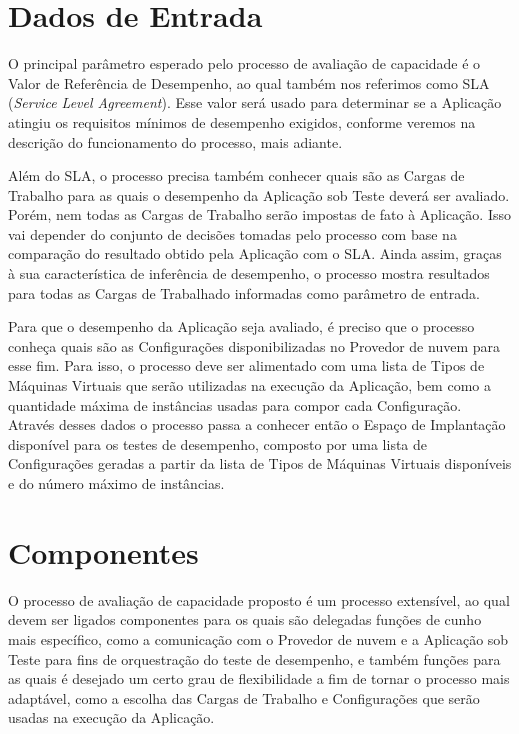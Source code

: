 \section{Dados de Entrada}

O principal parâmetro esperado pelo processo de avaliação de capacidade é o Valor
de Referência de Desempenho, ao qual também nos referimos como SLA 
(\emph{Service Level Agreement}). Esse valor será usado para determinar 
se a Aplicação atingiu os requisitos mínimos de desempenho exigidos, conforme
veremos na descrição do funcionamento do processo, mais adiante.

Além do SLA, o processo precisa também conhecer quais são as Cargas de Trabalho
para as quais o desempenho da Aplicação sob Teste deverá ser avaliado. Porém,
nem todas as Cargas de Trabalho serão impostas de fato à Aplicação. Isso vai 
depender do conjunto de decisões tomadas pelo processo com base na comparação do 
resultado obtido pela Aplicação com o SLA. Ainda assim, graças à sua característica 
de inferência de desempenho, o processo mostra resultados para todas as Cargas de 
Trabalhado informadas como parâmetro de entrada.

Para que o desempenho da Aplicação seja avaliado, é preciso que o processo conheça 
quais são as Configurações disponibilizadas no Provedor de nuvem para esse fim. 
Para isso, o processo deve ser alimentado com uma lista de Tipos de Máquinas Virtuais 
que serão utilizadas na execução da Aplicação, bem como a quantidade máxima de 
instâncias usadas para compor cada Configuração. Através desses dados o processo
passa a conhecer então o Espaço de Implantação disponível para os testes de 
desempenho, composto por uma lista de Configurações geradas a partir da lista de
Tipos de Máquinas Virtuais disponíveis e do número máximo de instâncias.

\section{Componentes}
O processo de avaliação de capacidade proposto é um processo extensível, ao qual
devem ser ligados componentes para os quais são delegadas funções de cunho mais
específico, como a comunicação com o Provedor de nuvem e a Aplicação sob Teste
para fins de orquestração do teste de desempenho, e também funções para as quais
é desejado um certo grau de flexibilidade a fim de tornar o processo mais adaptável,
como a escolha das Cargas de Trabalho e Configurações que serão usadas na execução
da Aplicação.

